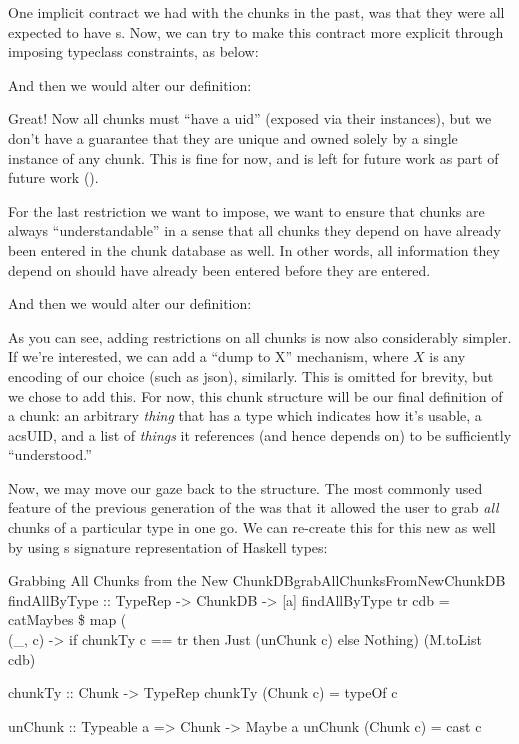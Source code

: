 One implicit contract we had with the chunks in the past, was that they were all
expected to have \UID{}s. Now, we can try to make this contract more explicit
through imposing typeclass constraints, as below:

\uidOwnershipContract{}

And then we would alter our \Chunk{} definition:

\chunksWithUidConstraint{}

Great! Now all chunks must ``have a \acs{uid}'' (exposed via their \HasUID{}
instances), but we don't have a guarantee that they are unique and owned solely
by a single instance of any chunk. This is fine for now, and is left for future
work as part of future work ().

For the last restriction we want to impose, we want to ensure that chunks are
always ``understandable'' in a sense that all chunks they depend on have already
been entered in the chunk database as well. In other words, all information they
depend on should have already been entered before they are entered.

\chunkDependenciesContract{}

And then we would alter our \Chunk{} definition:

\chunksWithUidAndRefListConstraint{}

As you can see, adding restrictions on all chunks is now also considerably
simpler. If we're interested, we can add a ``dump to X'' mechanism, where $X$ is
any encoding of our choice (such as \acs{json}), similarly. This is omitted for
brevity, but we chose to add this. For now, this chunk structure will be our
final definition of a chunk: an arbitrary \textit{thing} that has a type which
indicates how it's usable, a acs{UID}, and a list of \textit{things} it
references (and hence depends on) to be sufficiently ``understood.''

Now, we may move our gaze back to the \ChunkDB{} structure. The most commonly
used feature of the previous generation of the \ChunkDB{} was that it allowed
the user to grab \textit{all} chunks of a particular type in one go. We can
re-create this for this new \ChunkDB{} as well by using
s \TypeRep{} signature representation of Haskell types:

\begin{pseudohaskell}{Grabbing All Chunks from the New ChunkDB}{grabAllChunksFromNewChunkDB}
findAllByType :: TypeRep -> ChunkDB -> [a]
findAllByType tr cdb = catMaybes \$ map (\\(_, c) -> if chunkTy c == tr then Just (unChunk c) else Nothing) (M.toList cdb)

chunkTy :: Chunk -> TypeRep
chunkTy (Chunk c) = typeOf c

unChunk :: Typeable a => Chunk -> Maybe a
unChunk (Chunk c) = cast c
\end{pseudohaskell}

